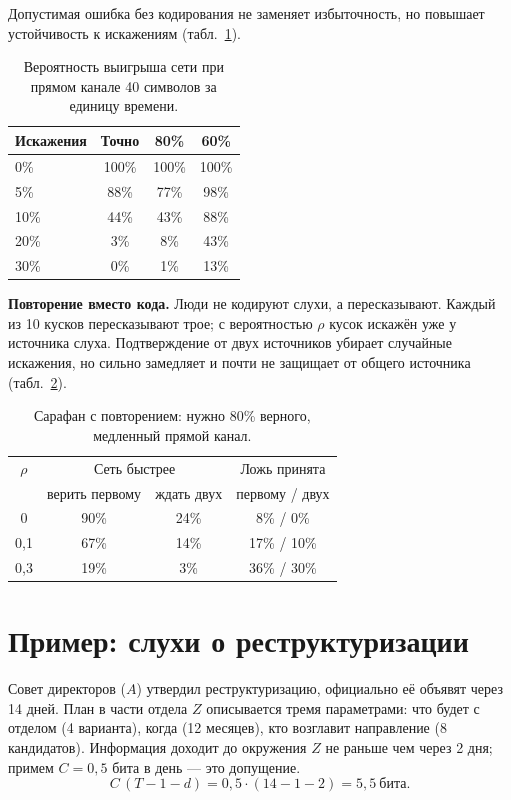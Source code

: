 \documentclass[10pt,a4paper,twocolumn]{article}
\theoremstyle{plain}
\begin{document}
Допустимая ошибка без кодирования не заменяет избыточность, но повышает устойчивость к искажениям (табл.~\ref{tab:corr}).

\begin{table}[t]
\centering\small
\caption{Вероятность выигрыша сети при прямом канале 40 символов за единицу времени.}
\label{tab:corr}
\begin{tabular}{@{}lccc@{}}
\toprule
Искажения & Точно & 80\% & 60\% \\
\midrule
0\% & 100\% & 100\% & 100\% \\
5\% & 88\% & 77\% & 98\% \\
10\% & 44\% & 43\% & 88\% \\
20\% & 3\% & 8\% & 43\% \\
30\% & 0\% & 1\% & 13\% \\
\bottomrule
\end{tabular}
\end{table}

\textbf{Повторение вместо кода.} Люди не кодируют слухи, а пересказывают. Каждый из 10 кусков пересказывают трое; с вероятностью $\rho$ кусок искажён уже у источника слуха. Подтверждение от двух источников убирает случайные искажения, но сильно замедляет и почти не защищает от общего источника (табл.~\ref{tab:gossip}).

\begin{table}[t]
\centering\small
\caption{Сарафан с повторением: нужно 80\% верного, медленный прямой канал.}
\label{tab:gossip}
\begin{tabular}{@{}cccc@{}}
\toprule
$\rho$ & \multicolumn{2}{c}{Сеть быстрее} & Ложь принята \\
 & верить первому & ждать двух & первому / двух \\
\midrule
0 & 90\% & 24\% & 8\% / 0\% \\
0,1 & 67\% & 14\% & 17\% / 10\% \\
0,3 & 19\% & 3\% & 36\% / 30\% \\
\bottomrule
\end{tabular}
\end{table}

\section{Пример: слухи о реструктуризации}

Совет директоров ($A$) утвердил реструктуризацию, официально её объявят через 14 дней. План в части отдела $Z$ описывается тремя параметрами: что будет с отделом (4 варианта), когда (12 месяцев), кто возглавит направление (8 кандидатов). Информация доходит до окружения $Z$ не раньше чем через 2 дня; примем $C=0{,}5$ бита в день — это допущение.
\[
C\,(T-1-d) = 0{,}5\cdot(14-1-2) = 5{,}5\ \text{бита}.
\]
\end{document}
